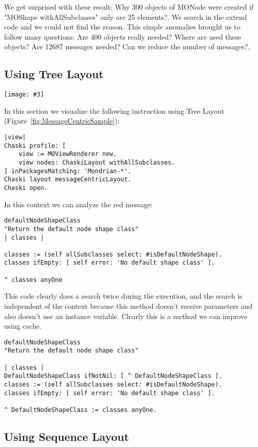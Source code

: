 \documentclass{sig-alternate}
\newcommand{\largefig}[4]{
	\begin{figure*}[#1]
		\centering
		\texttt{[image: \#3]}
		\caption{\label{fig:#3}#4}
	\end{figure*}}
\newcommand{\figref}[1]{Figure~\ref{fig:#1}}
\begin{document}
We get surprised with these result: Why 300 objects of MONode were created if "MOShape withAllSubclasses" only are 25 elements?. We search in the extend code and we could not find the reason. This simple anomalies brought us to follow many questions: Are 400 objects really needed? Where are used these objects? Are 12687 messages needed? Can we reduce the number of messages?.

\subsection{Using Tree Layout}

\largefig{}{1.0}{MessageCentricSample}{Mondrian Tree Layout}

In this section we visualize the following instruction using Tree Layout (\figref{MessageCentricSample}):
\begin{lstlisting}[language=Smalltalk]
|view|
Chaski profile: [
	view := MOViewRenderer new.
	view nodes: ChaskiLayout withAllSubclasses.
] inPackagesMatching: 'Mondrian-*'.
Chaski layout messageCentricLayout.
Chaski open.
\end{lstlisting}


In this context we can analyze the red message:
\begin{lstlisting}[language=Smalltalk]
defaultNodeShapeClass
"Return the default node shape class"
| classes |

classes := (self allSubclasses select: #isDefaultNodeShape).
classes ifEmpty: [ self error: 'No default shape class' ].

^ classes anyOne
\end{lstlisting}

This code clearly does a search twice during the execution, and the search is independent of the context because this method doesn't receive parameters and also doesn't use an instance variable. Clearly this is a method we can improve using cache.
\begin{lstlisting}[language=Smalltalk]
defaultNodeShapeClass
"Return the default node shape class"

| classes |
DefaultNodeShapeClass ifNotNil: [ ^ DefaultNodeShapeClass ].
classes := (self allSubclasses select: #isDefaultNodeShape).
classes ifEmpty: [ self error: 'No default shape class' ].

^ DefaultNodeShapeClass := classes anyOne.

\end{lstlisting}

\subsection{Using Sequence Layout}
\end{document}
